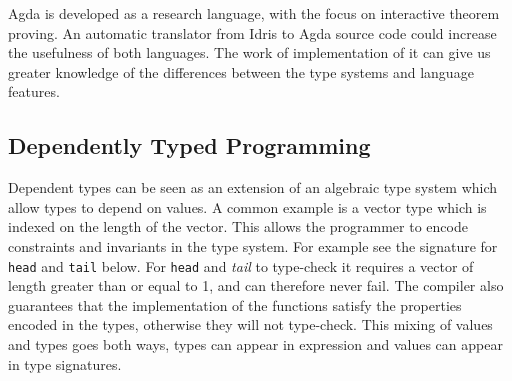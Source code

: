 \documentclass[parskip=half]{scrartcl}
\begin{document}
Agda is developed as a research language, with the focus on interactive theorem
proving.  An automatic translator from Idris to Agda source code could increase
the usefulness of both languages. The work of implementation of it can give us
greater knowledge of the differences between the type systems and language
features.


\subsection{Dependently Typed Programming}

Dependent types can be seen as an extension of an algebraic type system which
allow types to depend on values.
A common example is a vector type which is indexed on the length of
the vector. This allows the programmer to encode constraints and invariants in
the type system. For example see the signature for \texttt{head} and
\texttt{tail} below.  For \texttt{head} and \textit{tail} to type-check it requires a vector of
length greater than or equal to 1, and can therefore never fail.
The compiler also guarantees that the implementation of the functions satisfy
the properties encoded in the types, otherwise they will not type-check.
This mixing of values
and types goes both ways, types can appear in expression and values can appear
in type signatures.




\end{document}
